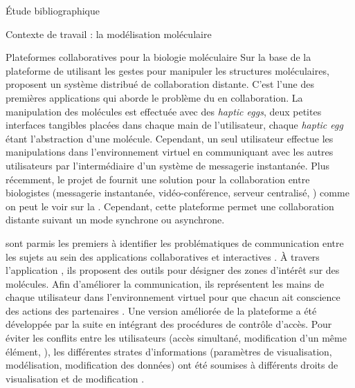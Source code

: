\documentclass[myfrancais,ngerman,english,french]{mythesis}
\begin{document}
\begin{mychapter}{Étude bibliographique}
\begin{mysection}{Contexte de travail : la modélisation moléculaire}
\begin{mysubsection}{Plateformes collaboratives pour la biologie moléculaire}
				Sur la base de la plateforme de  utilisant les gestes pour manipuler les structures moléculaires,  proposent un système distribué de collaboration distante.
				C'est l'une des premières applications qui aborde le problème du  en collaboration.
				La manipulation des molécules est effectuée avec des \textit{haptic eggs}, deux petites interfaces tangibles placées dans chaque main de l'utilisateur, chaque \textit{haptic egg} étant l'abstraction d'une molécule.
				Cependant, un seul utilisateur effectue les manipulations dans l'environnement virtuel en communiquant avec les autres utilisateurs par l'intermédiaire d'un système de messagerie instantanée.
				Plus récemment, le projet \myeMinerals de  fournit une solution pour la collaboration entre biologistes (messagerie instantanée, vidéo-conférence, serveur centralisé, \myetc) comme on peut le voir sur la .
				Cependant, cette plateforme permet une collaboration distante suivant un mode synchrone ou asynchrone.

				\begin{myfigure}
				\end{myfigure}

				 sont parmis les premiers à identifier les problématiques de communication entre les sujets au sein des applications collaboratives et interactives .
				À travers l'application \myAMMPVis, ils proposent des outils pour désigner des zones d'intérêt sur des molécules.
				Afin d'améliorer la communication, ils représentent les mains de chaque utilisateur dans l'environnement virtuel pour que chacun ait conscience des actions des partenaires .
				Une version améliorée \myAMMPEXTN de la plateforme a été développée par la suite en intégrant des procédures de contrôle d'accès.
				Pour éviter les conflits entre les utilisateurs (accès simultané, modification d'un même élément, \myetc), les différentes strates d'informations (paramètres de visualisation, modélisation, modification des données) ont été soumises à différents droits de visualisation et de modification .


\end{mysubsection}
\end{mysection}
\end{mychapter}
\end{document}
